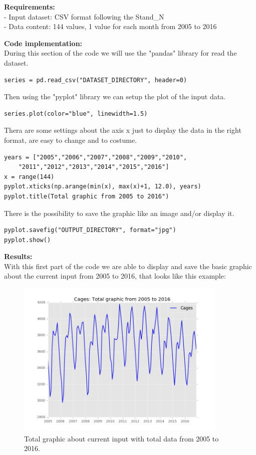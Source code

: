 \textbf{Requirements:}\\
- Input dataset: CSV format following the Stand\_N \\
- Data content: 144 values, 1 value for each month from 2005 to 2016

\textbf{Code implementation:}\\
During this section of the code we will use the "pandas" library for read the dataset.
\begin{lstlisting}
series = pd.read_csv("DATASET_DIRECTORY", header=0)
\end{lstlisting}

Then using the "pyplot" library we can setup the plot of the input data.
\begin{lstlisting}
series.plot(color="blue", linewidth=1.5)
\end{lstlisting}


Thera are some settings about the axis x just to display the data in the right format, are easy to change and to costume.
\begin{lstlisting}
years = ["2005","2006","2007","2008","2009","2010",
	"2011","2012","2013","2014","2015","2016"]
x = range(144)
pyplot.xticks(np.arange(min(x), max(x)+1, 12.0), years)
pyplot.title(Total graphic from 2005 to 2016")
\end{lstlisting}

There is the possibility to save the graphic like an image and/or display it.
\begin{lstlisting}
pyplot.savefig("OUTPUT_DIRECTORY", format="jpg")
pyplot.show()
\end{lstlisting}




\begin{minipage}{0.5\textwidth}
\textbf{Results:} \\
With this first part of the code we are able to display and save the basic graphic about the current input from 2005 to 2016, that looks like this example:
\end{minipage} \hfill
\begin{minipage}{0.45\textwidth}
\begin{figure}[H]
\includegraphics[width=0.9\textwidth]{Files/Cages_Total.jpg}
\caption{Total graphic about current input with total data from 2005 to 2016.}
\end{figure}
\end{minipage}


